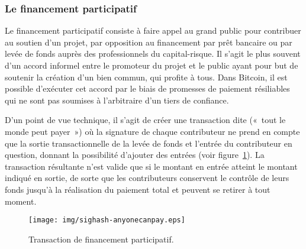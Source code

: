 
\subsubsection*{Le financement participatif} Le financement participatif consiste à faire appel au grand public pour contribuer au soutien d'un projet, par opposition au financement par prêt bancaire ou par levée de fonds auprès des professionnels du capital-risque. Il s'agit le plus souvent d'un accord informel entre le promoteur du projet et le public ayant pour but de soutenir la création d'un bien commun, qui profite à tous. Dans Bitcoin, il est possible d'exécuter cet accord par le biais de promesses de paiement résiliables qui ne sont pas soumises à l'arbitraire d'un tiers de confiance.

D'un point de vue technique, il s'agit de créer une transaction dite  («~tout le monde peut payer~») où la signature de chaque contributeur ne prend en compte que la sortie transactionnelle de la levée de fonds et l'entrée du contributeur en question, donnant la possibilité d'ajouter des entrées (voir figure~\ref{fig:sighash-anyonecanpay}). La transaction résultante n'est valide que si le montant en entrée atteint le montant indiqué en sortie, de sorte que les contributeurs conservent le contrôle de leurs fonds jusqu'à la réalisation du paiement total et peuvent se retirer à tout moment.

\begin{figure}[ht]
  \centering
  \texttt{[image: img/sighash-anyonecanpay.eps]}
  \caption{Transaction de financement participatif.}
  \label{fig:sighash-anyonecanpay}
\end{figure}

